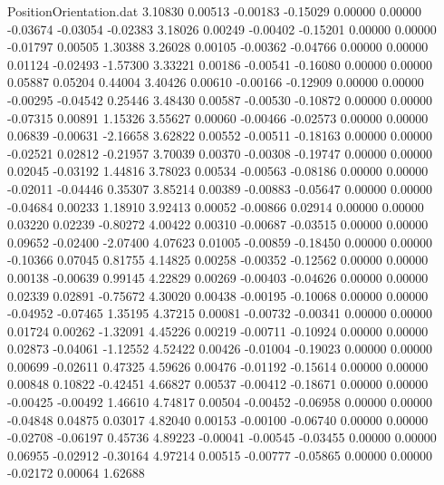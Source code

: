 \begin{filecontents}{PositionOrientation.dat}
   3.10830    0.00513   -0.00183    -0.15029    0.00000    0.00000   -0.03674   -0.03054   -0.02383
   3.18026    0.00249   -0.00402    -0.15201    0.00000    0.00000   -0.01797    0.00505    1.30388
   3.26028    0.00105   -0.00362    -0.04766    0.00000    0.00000    0.01124   -0.02493   -1.57300
   3.33221    0.00186   -0.00541    -0.16080    0.00000    0.00000    0.05887    0.05204    0.44004
   3.40426    0.00610   -0.00166    -0.12909    0.00000    0.00000   -0.00295   -0.04542    0.25446
   3.48430    0.00587   -0.00530    -0.10872    0.00000    0.00000   -0.07315    0.00891    1.15326
   3.55627    0.00060   -0.00466    -0.02573    0.00000    0.00000    0.06839   -0.00631   -2.16658
   3.62822    0.00552   -0.00511    -0.18163    0.00000    0.00000   -0.02521    0.02812   -0.21957
   3.70039    0.00370   -0.00308    -0.19747    0.00000    0.00000    0.02045   -0.03192    1.44816
   3.78023    0.00534   -0.00563    -0.08186    0.00000    0.00000   -0.02011   -0.04446    0.35307
   3.85214    0.00389   -0.00883    -0.05647    0.00000    0.00000   -0.04684    0.00233    1.18910
   3.92413    0.00052   -0.00866     0.02914    0.00000    0.00000    0.03220    0.02239   -0.80272
   4.00422    0.00310   -0.00687    -0.03515    0.00000    0.00000    0.09652   -0.02400   -2.07400
   4.07623    0.01005   -0.00859    -0.18450    0.00000    0.00000   -0.10366    0.07045    0.81755
   4.14825    0.00258   -0.00352    -0.12562    0.00000    0.00000    0.00138   -0.00639    0.99145
   4.22829    0.00269   -0.00403    -0.04626    0.00000    0.00000    0.02339    0.02891   -0.75672
   4.30020    0.00438   -0.00195    -0.10068    0.00000    0.00000   -0.04952   -0.07465    1.35195
   4.37215    0.00081   -0.00732    -0.00341    0.00000    0.00000    0.01724    0.00262   -1.32091
   4.45226    0.00219   -0.00711    -0.10924    0.00000    0.00000    0.02873   -0.04061   -1.12552
   4.52422    0.00426   -0.01004    -0.19023    0.00000    0.00000    0.00699   -0.02611    0.47325
   4.59626    0.00476   -0.01192    -0.15614    0.00000    0.00000    0.00848    0.10822   -0.42451
   4.66827    0.00537   -0.00412    -0.18671    0.00000    0.00000   -0.00425   -0.00492    1.46610
   4.74817    0.00504   -0.00452    -0.06958    0.00000    0.00000   -0.04848    0.04875    0.03017
   4.82040    0.00153   -0.00100    -0.06740    0.00000    0.00000   -0.02708   -0.06197    0.45736
   4.89223   -0.00041   -0.00545    -0.03455    0.00000    0.00000    0.06955   -0.02912   -0.30164
   4.97214    0.00515   -0.00777    -0.05865    0.00000    0.00000   -0.02172    0.00064    1.62688

\end{filecontents}
